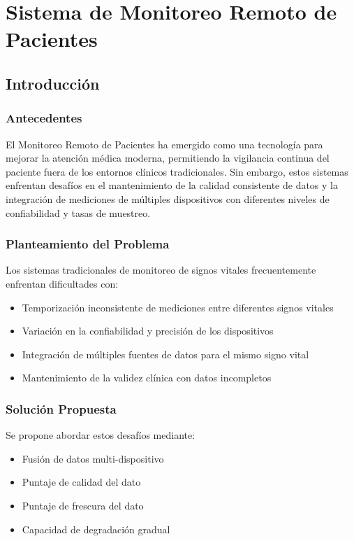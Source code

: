 \section{Sistema de Monitoreo Remoto de Pacientes}

\subsection{Introducción}

\subsubsection{Antecedentes}
El Monitoreo Remoto de Pacientes ha emergido como una tecnología para mejorar la atención médica moderna, permitiendo la vigilancia continua del paciente fuera de los entornos clínicos tradicionales. 
Sin embargo, estos sistemas enfrentan desafíos en el mantenimiento de la calidad consistente de datos y la integración de mediciones de múltiples dispositivos con diferentes niveles de confiabilidad 
y tasas de muestreo.

\subsubsection{Planteamiento del Problema}
Los sistemas tradicionales de monitoreo de signos vitales frecuentemente enfrentan dificultades con:
\begin{itemize}
    \item Temporización inconsistente de mediciones entre diferentes signos vitales
    \item Variación en la confiabilidad y precisión de los dispositivos
    \item Integración de múltiples fuentes de datos para el mismo signo vital
    \item Mantenimiento de la validez clínica con datos incompletos
\end{itemize}

\subsubsection{Solución Propuesta}
Se propone abordar estos desafíos mediante:
\begin{itemize}
    \item Fusión de datos multi-dispositivo 
    \item Puntaje de calidad del dato
    \item Puntaje de frescura del dato
    \item Capacidad de degradación gradual
\end{itemize}

